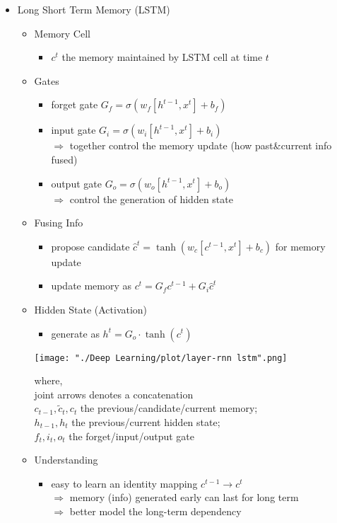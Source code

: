 \begin{itemize}
\item Long Short Term Memory (LSTM)
	\begin{itemize}
	\item Memory Cell
		\begin{itemize}
		\item $c^t$ the memory maintained by LSTM cell at time $t$
		\end{itemize}
	\item Gates
		\begin{itemize}
		\item forget gate $G_f=\sigma(w_f[h^{t-1}, x^t] + b_f)$
		\item input gate $G_i = \sigma(w_i[h^{t-1}, x^t] + b_i)$ \\
		$\Rightarrow$ together control the memory update (how past\&current info fused)
		\item output gate $G_o = \sigma(w_o[h^{t-1}, x^{t}] + b_o)$ \\
		$\Rightarrow$ control the generation of hidden state
		\end{itemize}
	\item Fusing Info
		\begin{itemize}
		\item propose candidate $\hat{c}^{t}=\tanh(w_c[c^{t-1}, x^{t}]+b_c)$ for memory update
		\item update memory as $c^t = G_f c^{t-1} + G_i \hat c^t$
		\end{itemize}
	\item Hidden State (Activation)
		\begin{itemize}
		\item generate as $h^t = G_o \cdot \tanh(c^t)$
		\end{itemize}
	\begin{minipage}[r]{0.5\linewidth}
	\texttt{[image: "./Deep Learning/plot/layer-rnn lstm".png]}
	\end{minipage}
	\begin{minipage}[l]{\linewidth}
	where, \\ 
	joint arrows denotes a concatenation \\ 
	$c_{t-1}, \widetilde c_t, c_t$ the previous/candidate/current memory; \\
	$h_{t-1},h_t$ the previous/current hidden state; \\ 
	$f_t, i_t, o_t$ the forget/input/output gate
	\end{minipage}

	\item Understanding
		\begin{itemize}
		\item easy to learn an identity mapping $c^{t-1}\rightarrow c^t$ \\
		$\Rightarrow$ memory (info) generated early can last for long term \\
		$\Rightarrow$ better model the long-term dependency
		\end{itemize}


\end{itemize}
\end{itemize}
